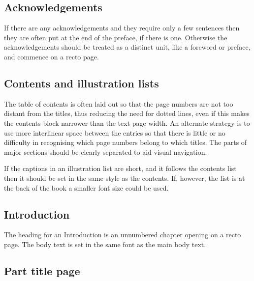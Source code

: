 \documentclass[10pt,a4paper,extrafontsizes]{memoir}
\begin{document}
\subsection{Acknowledgements}

\begin{paracol}{2}
\switchEng
    If there are any acknowledgements and they 
require only a few sentences then they are often put at the end of the 
preface, if there is one. Otherwise the acknowledgements
should be treated as a distinct unit, like a foreword or preface, and commence
on a recto page.
\end{paracol}

\subsection{Contents and illustration lists}

\begin{paracol}{2}
\switchEng
    The table of contents is often laid out so 
that the page numbers
are not too distant from the titles, thus reducing the need for dotted lines,
even if this makes the contents block narrower than the text page width. 
An alternate strategy is to use more interlinear space between the entries
so that there is little or no difficulty in recognising which page
numbers belong to which titles. The parts of major sections should be
clearly separated to aid visual navigation.

   If the captions in an illustration list 
are short, and it follows the
contents list then it should be set in the same style as the contents. 
If, however, the list is at the back of the book a smaller font size could 
be used.
\end{paracol}

\subsection{Introduction}

\begin{paracol}{2}
\switchEng
    The heading for an Introduction is an unnumbered
chapter opening on a recto page. The body text is set in the same font 
as the main body text. 
\end{paracol}

\subsection{Part title page}
\end{document}
